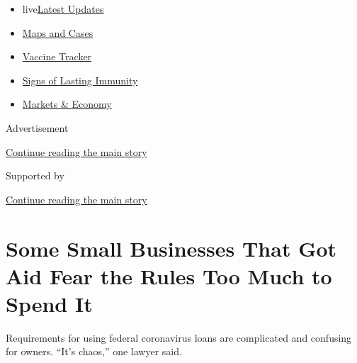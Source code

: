 \begin{itemize}
\tightlist
\item
  live\href{https://www.nytimes.com/2020/08/17/world/covid-19-coronavirus.html?name=styln-coronavirus-markets\&region=TOP_BANNER\&variant=undefined\&block=storyline_menu_recirc\&action=click\&pgtype=Article\&impression_id=9d2fdf01-e0a4-11ea-9b77-b5fd14d00076}{Latest
  Updates}
\item
  \href{https://www.nytimes.com/interactive/2020/us/coronavirus-us-cases.html?name=styln-coronavirus-markets\&region=TOP_BANNER\&variant=undefined\&block=storyline_menu_recirc\&action=click\&pgtype=Article\&impression_id=9d2fdf02-e0a4-11ea-9b77-b5fd14d00076}{Maps
  and Cases}
\item
  \href{https://www.nytimes.com/interactive/2020/science/coronavirus-vaccine-tracker.html?name=styln-coronavirus-markets\&region=TOP_BANNER\&variant=undefined\&block=storyline_menu_recirc\&action=click\&pgtype=Article\&impression_id=9d2fdf03-e0a4-11ea-9b77-b5fd14d00076}{Vaccine
  Tracker}
\item
  \href{https://www.nytimes.com/2020/08/16/health/coronavirus-immunity-antibodies.html?name=styln-coronavirus-markets\&region=TOP_BANNER\&variant=undefined\&block=storyline_menu_recirc\&action=click\&pgtype=Article\&impression_id=9d2fdf04-e0a4-11ea-9b77-b5fd14d00076}{Signs
  of Lasting Immunity}
\item
  \href{https://www.nytimes.com/live/2020/08/17/business/stock-market-today-coronavirus?name=styln-coronavirus-markets\&region=TOP_BANNER\&variant=undefined\&block=storyline_menu_recirc\&action=click\&pgtype=Article\&impression_id=9d2fdf05-e0a4-11ea-9b77-b5fd14d00076}{Markets
  \& Economy}
\end{itemize}

Advertisement

\protect\hyperlink{after-top}{Continue reading the main story}

Supported by

\protect\hyperlink{after-sponsor}{Continue reading the main story}

\hypertarget{some-small-businesses-that-got-aid-fear-the-rules-too-much-to-spend-it}{%
\section{Some Small Businesses That Got Aid Fear the Rules Too Much to
Spend
It}\label{some-small-businesses-that-got-aid-fear-the-rules-too-much-to-spend-it}}

Requirements for using federal coronavirus loans are complicated and
confusing for owners. ``It's chaos,'' one lawyer said.

